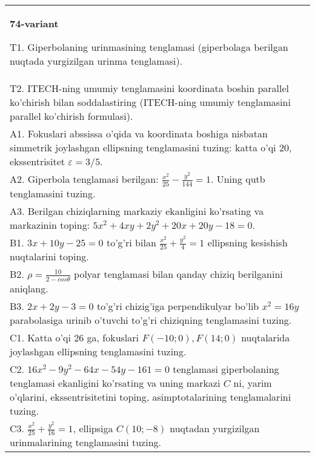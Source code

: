 \documentclass{article}
\begin{document}
\begin{tabular}{m{17cm}}
\textbf{74-variant}
\newline

T1. Giperbolaning urinmasining tenglamasi (giperbolaga berilgan nuqtada yurgizilgan urinma tenglamasi).\\

T2. ITECH-ning umumiy tenglamasini koordinata boshin parallel ko'chirish bilan soddalastiring (ITECH-ning umumiy tenglamasini parallel ko'chirish formulasi).\\

A1. Fokuslari abssissa o'qida va koordinata boshiga nisbatan simmetrik joylashgan ellipsning tenglamasini tuzing: katta o'qi $20$, ekssentrisitet $\varepsilon=3/5$.\\

A2. Giperbola tenglamasi berilgan: $\frac{x^{2}}{25}-\frac{y^{2}}{144}=1$. Uning qutb tenglamasini tuzing.\\

A3. Berilgan chiziqlarning markaziy ekanligini ko'rsating va markazinin toping: $5x^{2}+4xy+2y^{2}+20x+20y-18=0$.\\

B1. $3x + 10y - 25 = 0$ to'g'ri bilan $\frac{x^{2}}{25} + \frac{y^{2}}{4} = 1$ ellipsning kesishish nuqtalarini toping.  \\

B2. $\rho = \frac{10}{2 - cos\theta}$ polyar tenglamasi bilan qanday chiziq berilganini aniqlang.  \\

B3. $2x + 2y - 3 = 0$ to'g'ri chizig'iga perpendikulyar bo'lib $x^{2} = 16y$ parabolasiga urinib o'tuvchi to'g'ri chiziqning tenglamasini tuzing.  \\

C1. Katta o'qi 26 ga, fokuslari $F( - 10;0), F(14;0)$ nuqtalarida joylashgan ellipsning tenglamasini tuzing.  \\

C2. $16x^{2} - 9y^{2} - 64x - 54y - 161 = 0$ tenglamasi giperbolaning tenglamasi ekanligini ko'rsating va uning markazi $C$ ni, yarim o'qlarini, ekssentrisitetini toping, asimptotalarining tenglamalarini tuzing.  \\

C3. $\frac{x^{2}}{25} + \frac{y^{2}}{16} = 1$, ellipsiga $C(10; - 8)$ nuqtadan yurgizilgan urinmalarining tenglamasini tuzing.  \\

\end{tabular}
\vspace{1cm}
\end{document}
